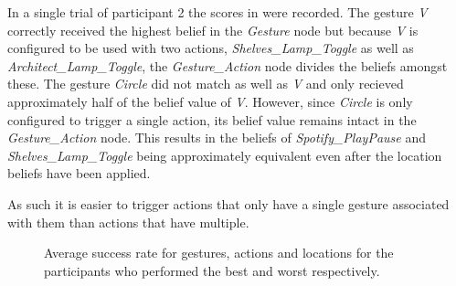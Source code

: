 In a single trial of participant 2 the scores in  were recorded.
The gesture \emph{V} correctly received the highest belief in the \emph{Gesture} node but because \emph{V} is configured to be used with two actions, \emph{Shelves\_Lamp\_Toggle} as well as \emph{Architect\_Lamp\_Toggle}, the \emph{Gesture\_Action} node divides the beliefs amongst these.
The  gesture \emph{Circle} did not match as well as \emph{V} and only recieved approximately half of the belief value of \emph{V}.
However, since \emph{Circle} is only configured to trigger a single action, its belief value remains intact in the \emph{Gesture\_Action} node.
This results in the beliefs of \emph{Spotify\_PlayPause} and \emph{Shelves\_Lamp\_Toggle} being approximately equivalent even after the location beliefs have been applied.

As such it is easier to trigger actions that only have a single gesture associated with them than actions that have multiple.

\begin{figure}[]
\begin{subfigure}{0.45\textwidth}
\label{fig:participant-1}
\end{subfigure}
\begin{subfigure}{0.45\textwidth}
\label{fig:participant-2}
\end{subfigure}
\caption{Average success rate for gestures, actions and locations for the participants who performed the best and worst respectively.}
\end{figure}

